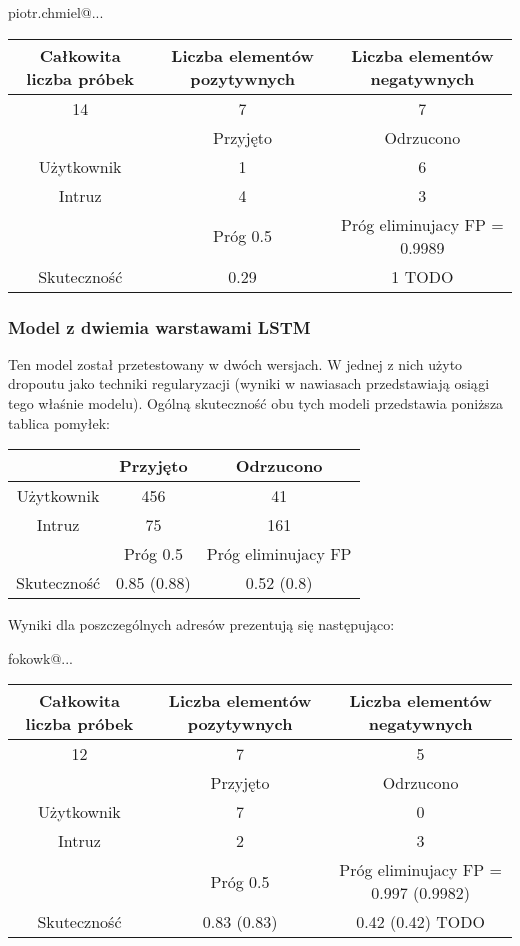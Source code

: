 		piotr.chmiel@... \\
		\begin{tabular}{|c|c|c|}
		\hline
		Całkowita liczba próbek & Liczba elementów pozytywnych & Liczba elementów negatywnych \\ \hline
			    	  14  & 7             & 7 \\ \hline
						    & Przyjęto   & Odrzucono \\ \hline
		Użytkownik  & 1             & 6 \\ \hline
		Intruz		    & 4             & 3 \\ \hline
						    & Próg 0.5  & Próg eliminujacy FP = 0.9989 \\ \hline
		Skuteczność & 0.29       & 1 TODO\\ \hline
		\end{tabular}

		\subsubsection{Model z dwiemia warstawami LSTM}
		Ten model został przetestowany w dwóch wersjach. W jednej z nich użyto dropoutu jako techniki regularyzacji (wyniki w nawiasach przedstawiają osiągi tego właśnie modelu). Ogólną skuteczność obu tych modeli przedstawia poniższa tablica pomyłek: \\

		\begin{tabular}{|c|c|c|}
		\hline
		& Przyjęto & Odrzucono \\ \hline
		Użytkownik & 456 & 41 \\ \hline
		Intruz & 75 & 161 \\ \hline
		& Próg 0.5 & Próg eliminujacy FP \\ \hline
		Skuteczność & 0.85 (0.88) & 0.52 (0.8) \\ \hline
		\end{tabular}

		Wyniki dla poszczególnych adresów prezentują się następująco:

		fokowk@... \\
		\begin{tabular}{|c|c|c|}
		\hline
		Całkowita liczba próbek & Liczba elementów pozytywnych & Liczba elementów negatywnych \\ \hline
			    	  12  & 7             & 5 \\ \hline
						    & Przyjęto   & Odrzucono \\ \hline
		Użytkownik  & 7             & 0 \\ \hline
		Intruz		    & 2             & 3 \\ \hline
						    & Próg 0.5  	& Próg eliminujacy FP = 0.997 (0.9982) \\ \hline
		Skuteczność & 0.83 (0.83)       & 0.42 (0.42) TODO\\ \hline
		\end{tabular}

